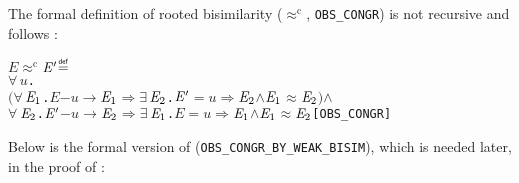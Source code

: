\documentclass[GCNS]{yincog}
\renewcommand{\HOLBoundVar}[1]{\ensuremath{\mathit{#1}}}
\renewcommand{\HOLFreeVar}[1]{\ensuremath{\mathit{#1}}}
\renewcommand{\HOLSymConst}[1]{#1}
\renewcommand{\HOLTokenConj}{\ensuremath{\wedge}}
\renewcommand{\HOLTokenDefEquality}{\ensuremath{\mathrel{\overset{\makebox [0pt]{\text{\tiny \textsf{def}}}}{=}}}}
\renewcommand{\HOLTokenExists}{\ensuremath{\exists \,}}
\renewcommand{\HOLTokenForall}{\ensuremath{\forall \,}}
\theoremstyle{remark}
\theoremstyle{theorem}
\theoremstyle{remark}
\newcommand{\HOLTokenWeakEQ}{$\approx$}
\newcommand{\HOLTokenObsCongr}{$\approx^{\mathrm{c}}\!$}
\newcommand{\HOLTokenTransBegin}{$-$}
\newcommand{\HOLTokenTransEnd}{$\rightarrow$\xspace}
\newcommand{\HOLTokenWeakTransBegin}{$=$}
\newcommand{\HOLTokenWeakTransEnd}{$\Rightarrow$\xspace}
\renewcommand{\HOLTokenImp}{\ensuremath{\Longrightarrow}}
\newcommand{\rapprox}{\mathrel{\approx^{\mathrm{c}}}}
\begin{document}
The formal definition of rooted bisimilarity ($\rapprox $,
\texttt{OBS\_CONGR}) is not recursive and follows :
%
\begin{alltt}
   \HOLFreeVar{E} \HOLSymConst{\HOLTokenObsCongr} \ensuremath{\HOLFreeVar{E}\sp{\prime}} \HOLTokenDefEquality{}
     \HOLSymConst{\HOLTokenForall{}}\HOLBoundVar{u}.
         \ensuremath{(}\HOLSymConst{\HOLTokenForall{}}\ensuremath{\HOLBoundVar{E}\sb{\mathrm{1}}}. \HOLFreeVar{E} \HOLTokenTransBegin\HOLBoundVar{u}\HOLTokenTransEnd \ensuremath{\HOLBoundVar{E}\sb{\mathrm{1}}} \HOLSymConst{\HOLTokenImp{}} \HOLSymConst{\HOLTokenExists{}}\ensuremath{\HOLBoundVar{E}\sb{\mathrm{2}}}. \ensuremath{\HOLFreeVar{E}\sp{\prime}} \HOLTokenWeakTransBegin\HOLBoundVar{u}\HOLTokenWeakTransEnd \ensuremath{\HOLBoundVar{E}\sb{\mathrm{2}}} \HOLSymConst{\HOLTokenConj{}} \ensuremath{\HOLBoundVar{E}\sb{\mathrm{1}}} \HOLSymConst{\HOLTokenWeakEQ} \ensuremath{\HOLBoundVar{E}\sb{\mathrm{2}}}\ensuremath{)} \HOLSymConst{\HOLTokenConj{}}
         \HOLSymConst{\HOLTokenForall{}}\ensuremath{\HOLBoundVar{E}\sb{\mathrm{2}}}. \ensuremath{\HOLFreeVar{E}\sp{\prime}} \HOLTokenTransBegin\HOLBoundVar{u}\HOLTokenTransEnd \ensuremath{\HOLBoundVar{E}\sb{\mathrm{2}}} \HOLSymConst{\HOLTokenImp{}} \HOLSymConst{\HOLTokenExists{}}\ensuremath{\HOLBoundVar{E}\sb{\mathrm{1}}}. \HOLFreeVar{E} \HOLTokenWeakTransBegin\HOLBoundVar{u}\HOLTokenWeakTransEnd \ensuremath{\HOLBoundVar{E}\sb{\mathrm{1}}} \HOLSymConst{\HOLTokenConj{}} \ensuremath{\HOLBoundVar{E}\sb{\mathrm{1}}} \HOLSymConst{\HOLTokenWeakEQ} \ensuremath{\HOLBoundVar{E}\sb{\mathrm{2}}}\hfill{[OBS\_CONGR]}
\end{alltt}
%
Below is the formal version of  (\texttt{OBS\_CONGR\_BY\_WEAK\_BISIM}),
which is needed later, in the proof of :
%
\end{document}
